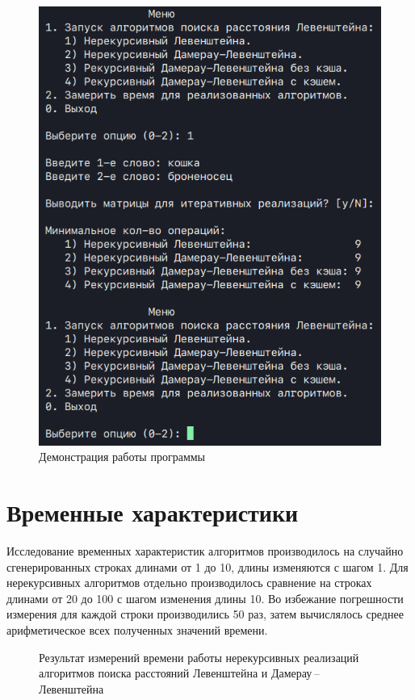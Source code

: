 \clearpage
\begin{figure}[h]
    \centering
    \includegraphics[height=0.6\textheight]{images/prog_demo.png}
    \caption{Демонстрация работы программы}
    \label{fig:prog-demo}
\end{figure}

\section{Временные характеристики}

Исследование временных характеристик алгоритмов производилось на случайно сгенерированных строках длинами от 1 до 10, длины изме\-няются с шагом 1. Для нерекурсивных алгоритмов отдельно производилось сравнение на строках длинами от 20 до 100 с шагом изменения длины 10. Во избежание погрешности измерения для каждой строки производились 50 раз, затем вычислялось среднее арифметическое всех полученных значений времени.

\begin{figure}[H]
    \centering
    
    \caption{Результат измерений времени работы нерекурсивных реализаций алгоритмов поиска расстояний Левенштейна и Дамерау\,--\,Левенштейна}
    \label{fig:nonrec-time}
\end{figure}

